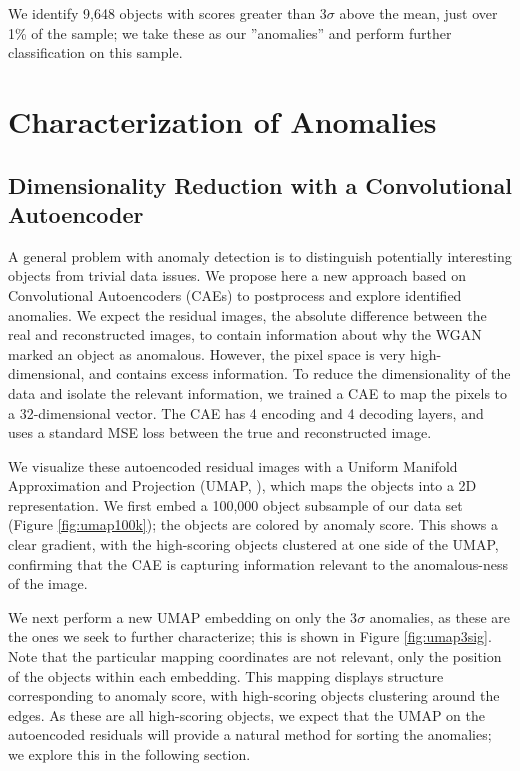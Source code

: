 \documentclass{article}
\begin{document}
We identify 9,648 objects with scores greater than 3$\sigma$ above the mean, just over 1\% of the sample; we take these as our ''anomalies'' and perform further classification on this sample.


\section{Characterization of Anomalies}
\label{charac}

\subsection{Dimensionality Reduction with a Convolutional Autoencoder}

A general problem with anomaly detection is to distinguish potentially interesting objects from trivial data issues.  
We propose here a new approach based on Convolutional Autoencoders (CAEs) to postprocess and explore identified anomalies. 
We expect the residual images, the absolute difference between the real and reconstructed images, to contain information about why the WGAN marked an object as anomalous.
However, the pixel space is very high-dimensional, and contains excess information.
To reduce the dimensionality of the data and isolate the relevant information, we trained a CAE to map the pixels to a 32-dimensional vector.
The CAE has 4 encoding and 4 decoding layers, and uses a standard MSE loss between the true and reconstructed image.

We visualize these autoencoded residual images with a Uniform Manifold Approximation and Projection (UMAP, \citealt{McInnes2018}), which maps the objects into a 2D representation.
We first embed a 100,000 object subsample of our data set (Figure \ref{fig:umap100k}); the objects are colored by anomaly score.
This shows a clear gradient, with the high-scoring objects clustered at one side of the UMAP, confirming that the CAE is capturing information relevant to the anomalous-ness of the image.

We next perform a new UMAP embedding on only the 3$\sigma$ anomalies, as these are the ones we seek to further characterize; this is shown in Figure \ref{fig:umap3sig}.
Note that the particular mapping coordinates are not relevant, only the position of the objects within each embedding.
This mapping displays structure corresponding to anomaly score, with high-scoring objects clustering around the edges.
As these are all high-scoring objects, we expect that the UMAP on the autoencoded residuals will provide a natural method for sorting the anomalies; we explore this in the following section.
\end{document}
